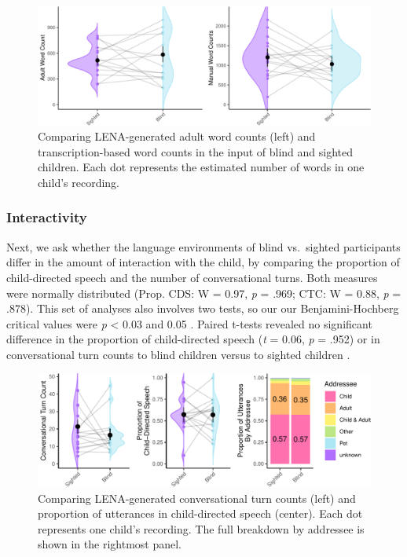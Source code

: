\documentclass[
  man,floatsintext]{apa6}
\begin{document}
\begin{figure}
\centering
\includegraphics{input_quality_manuscript_files/figure-latex/quantity-plots-1.pdf}
\caption{\label{fig:quantity-plots}Comparing LENA-generated adult word counts (left) and transcription-based word counts in the input of blind and sighted children. Each dot represents the estimated number of words in one child's recording.}
\end{figure}

\hypertarget{interactivity-1}{%
\subsubsection{Interactivity}\label{interactivity-1}}

Next, we ask whether the language environments of blind vs.~sighted participants differ in the amount of interaction with the child, by comparing the proportion of child-directed speech and the number of conversational turns. Both measures were normally distributed (Prop. CDS: W = 0.97, \emph{p} = .969; CTC: W = 0.88, \emph{p} = .878). This set of analyses also involves two tests, so our our Benjamini-Hochberg critical values were \emph{p} \textless{} 0.03 and 0.05 . Paired t-tests revealed no significant difference in the proportion of child-directed speech (\emph{t} = 0.06, \emph{p} = .952) or in conversational turn counts to blind children versus to sighted children .

\begin{figure}
\centering
\includegraphics{input_quality_manuscript_files/figure-latex/interactivity-plots-1.pdf}
\caption{\label{fig:interactivity-plots}Comparing LENA-generated conversational turn counts (left) and proportion of utterances in child-directed speech (center). Each dot represents one child's recording. The full breakdown by addressee is shown in the rightmost panel.}
\end{figure}
\end{document}
